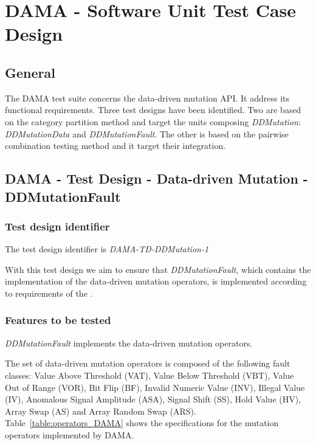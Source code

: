 
\chapter{DAMA - Software Unit Test Case Design}
\label{chap:design_DAMA}


\section{General}

The DAMA test suite concerns the data-driven mutation API. It address its functional requirements. Three test designs have been identified. Two are based on the category partition method and target the units composing \emph{DDMutation}: \emph{DDMutationData} and \emph{DDMutationFault}.
The other is based on the pairwise combination testing method and it target their integration.

\section{DAMA - Test Design - Data-driven Mutation - DDMutationFault}

\subsection{Test design identifier}

The test design identifier is \emph{DAMA-TD-DDMutation-1}

With this test design we aim to ensure that \emph{DDMutationFault}, which contains the implementation of the data-driven mutation operators, is implemented according to requirements of the \FAQAS.

\subsection{Features to be tested}

\emph{DDMutationFault} implements the data-driven mutation operators.

The set of data-driven mutation operators  is composed of the following fault classes: Value Above Threshold (VAT), Value Below Threshold (VBT), Value Out of Range (VOR), Bit Flip (BF), Invalid Numeric Value (INV), Illegal Value (IV), Anomalous Signal Amplitude (ASA), Signal Shift (SS), Hold Value (HV), Array Swap (AS) and Array Random Swap (ARS).
Table~\ref{table:operators_DAMA} shows the specifications for the mutation operators implemented by DAMA.

